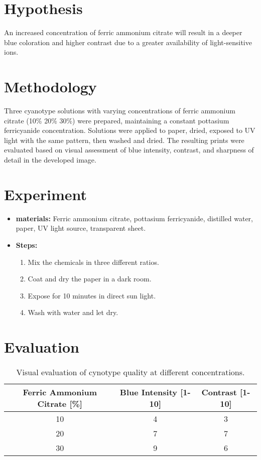 \documentclass[a4paper,12pt]{article}
\begin{document}
\section{Hypothesis}
An increased concentration of ferric ammonium citrate will result in a deeper blue coloration and higher contrast due to a greater availability of light-sensitive  ions.

\section{Methodology}
Three cyanotype solutions with varying concentrations of ferric ammonium citrate (10\% 20\% 30\%) were prepared, maintaining a constant pottasium ferricyanide concentration. Solutions were applied to paper, dried, exposed to UV light with the same pattern, then washed and dried. The resulting prints were evaluated based on visual assessment of blue intensity, contrast, and sharpness of detail in the developed image.

\section{Experiment}
\begin{itemize}
  \item \textbf{materials:} Ferric ammonium citrate, pottasium ferricyanide, distilled water, paper, UV light source, transparent sheet.
  \item \textbf{Steps:}
  \begin{enumerate}
    \item Mix the chemicals in three different ratios.
    \item Coat and dry the paper in a dark room.
    \item Expose for 10 minutes in direct sun light.
    \item Wash with water and let dry.
  \end{enumerate}
\end{itemize}

\section{Evaluation}

\begin{table}[h]
\centering
\begin{tabular}{ccc}
\toprule
\textbf{Ferric Ammonium Citrate [\%]} & \textbf{Blue Intensity [1-10]} & \textbf{Contrast [1-10]} \\
\midrule
10 & 4 & 3 \\
20 & 7 & 7 \\
30 & 9 & 6 \\
\bottomrule
\end{tabular}
\caption{Visual evaluation of cynotype quality at different concentrations.}
\label{tab:results}
\end{table}
\end{document}
